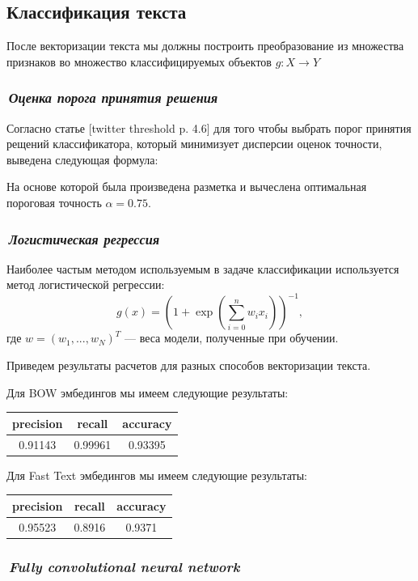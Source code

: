 \documentclass[12pt]{article}
\begin{document}
\subsection*{Классификация текста}
После векторизации текста мы должны построить преобразование из множества признаков во множество классифицируемых объектов $g: X \rightarrow Y$

\subsubsection*{\it\,Оценка порога принятия решения}
Согласно статье [twitter threshold p. 4.6] для того чтобы выбрать порог принятия рещений классификатора, который минимизует дисперсии оценок точности, выведена следующая формула:

На основе которой была произведена разметка и вычеслена оптимальная пороговая точность $\alpha = 0.75$. 

\subsubsection*{\it\,Логистическая регрессия}
Наиболее частым методом используемым в задаче классификации используется метод логистической регрессии:
$$
g(x) = \left(1 + \exp{ \left( \sum_{i=0}^n w_i x_i  \right) }\right)^{-1},
$$
где $w=(w_1, ..., w_N)^T$ --- веса модели, полученные при обучении.

Приведем результаты расчетов для разных способов векторизации текста.

Для BOW эмбедингов мы имеем следующие результаты:
\begin{center}
  \begin{tabular}{ | c | c | c |}
    \hline
     precision & recall & accuracy \\ \hline
     0.91143 & 0.99961 & 0.93395 \\ \hline
  \end{tabular}
\end{center}


Для Fast Text эмбедингов мы имеем следующие результаты:
\begin{center}
  \begin{tabular}{ | c | c | c |}
    \hline
     precision & recall & accuracy \\ \hline
     0.95523 & 0.8916 & 0.9371  \\ \hline
  \end{tabular}
\end{center}

\subsubsection*{\it\,Fully convolutional neural network}
\end{document}
